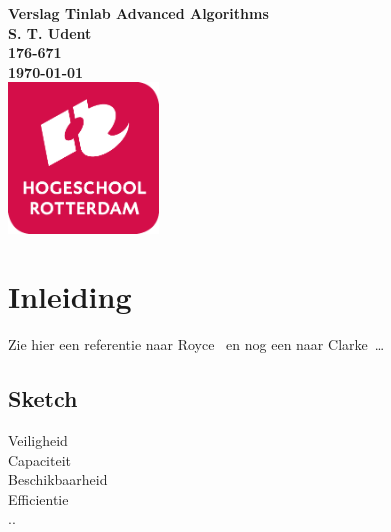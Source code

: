 \documentclass{article}
\begin{document}
\sffamily
\begin{titlepage}
  \centering
    \vfill
    {\bfseries\Huge
      Verslag Tinlab Advanced Algorithms \\
        \vskip2cm
      }
      {\bfseries\Large
        S. T. Udent\\
      }
      {
        \bfseries\normalsize
        176-671\\
        \vskip1cm
        \today\\
    }    
    \vfill
    \includegraphics[width=4cm]{logohr.png} %
    \vfill
    \vfill
\end{titlepage}
\newpage
\tableofcontents

\newpage
\section{Inleiding}
Zie hier een referentie naar Royce~\cite{royce1987managing} en nog een naar Clarke~\cite{modelchecking}\ldots 

\subsection{Sketch}
Veiligheid \\
Capaciteit \\
Beschikbaarheid \\
Efficientie \\
.. \\

\newpage
\end{document}
